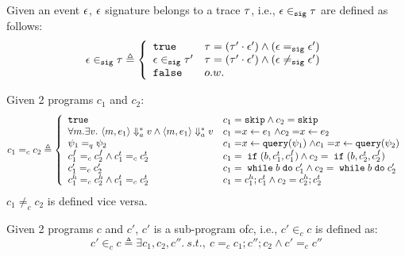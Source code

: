 Given an event $\mathtt{\epsilon}$, $\mathtt{\epsilon}$ signature belongs to a trace $\mathtt{\tau}$, i.e., $\mathtt{\epsilon} \in_{\mathtt{sig}} \mathtt{\tau}$ are defined as follows:
\begin{equation}
    \event \sigin \trace  
    \triangleq \left\{
    \begin{array}{ll} 
      \etrue                  & \trace =  (\trace' \cdot \event') \land (\event \sigeq \event') \\
      \event \sigin \trace'   & \trace =  (\trace' \cdot \event') \land (\event \signeq \event') \\ 
      \efalse                 & o.w.
    \end{array}
    \right.
  \end{equation}
%
\begin{defn}
%
\label{def:aq_prog}
Given 2 programs $c_1$ and $c_2$:
\[
c_1 =_{c} c_2
 \triangleq 
 \left\{
    \begin{array}{ll} 
      \etrue        
      & c_1 = \eskip \land c_2 = \eskip
      \\ 
      \forall m. \exists v. ~ \config{m, \expr_1} \aarrow^{*} v \land \config{m, \expr_1} \aarrow^{*} v     
      & c_1 = \assign{x}{\expr_1} \land c_2 = \assign{x}{\expr_2} 
      \\ 
      \qexpr_1 =_{q} \qexpr_2       
      & c_1 = \assign{x}{\query(\qexpr_1)} \land c_1 = \assign{x}{\query(\qexpr_2)} 
      \\
      c_1^f =_{c} c_2^f \land c_1^t =_{c} c_2^t
      & c_1 = \eif(b, c_1^t, c_1^f) \land c_2 = \eif(b, c_2^t, c_2^f)
      \\ 
      c_1' =_{c} c_2'         
      & c_1 = \ewhile b \edo c_1' \land c_2 = \ewhile b \edo c_2'
      \\ 
      c_1^h =_{c} c_2^h \land c_1^t =_{c} c_2^t
      & c_1 = c_1^h;c_1^t \land c_2 = c_2^h;c_2^t 
    \end{array}
    \right.
\]
%
$c_1 \neq_{c} c_2$  is defined vice versa.
%
\end{defn}
%
Given 2 programs $c$ and $c'$, $c'$ is a sub-program of$c$, i.e., $c' \in_{c} c$ is defined as:
\begin{equation}
c' \in_{c} c \triangleq \exists c_1, c_2, c''. ~ s.t.,~
c =_{c} c_1; c''; c_2 \land c' =_{c} c''
\end{equation} 
%
